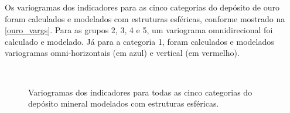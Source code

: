 Os variogramas dos indicadores para as cinco categorias do depósito de ouro foram calculados e modelados com estruturas esféricas, conforme mostrado na \autoref{ouro_vargs}. Para as grupos 2, 3, 4 e 5, um variograma omnidirecional foi calculado e modelado. Já para a categoria 1, foram calculados e modelados variogramas omni-horizontais (em azul) e vertical (em vermelho).

\begin{figure}[H]
    \caption{Variogramas dos indicadores para todas as cinco categorias do depósito mineral modelados com estruturas esféricas.} \label{ouro_vargs}
     \centering
     \hspace{1em}
     \\

\end{figure}
